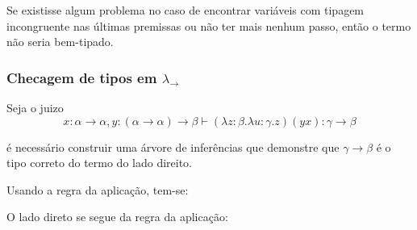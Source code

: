 \documentclass[../main.tex]{subfiles}
\begin{document}
Se existisse algum problema no caso de encontrar variáveis com tipagem incongruente nas últimas premissas ou não ter mais nenhum passo, então o termo não seria bem-tipado.



\subsubsection[Checagem de tipos no STLC]{Checagem de tipos em $\lambda_\to$}

Seja o juizo $$x : \alpha \to \alpha, y : (\alpha \to \alpha) \to \beta \vdash (\lambda z : \beta . \lambda u : \gamma . z)(yx) : \gamma \to \beta$$

é necessário construir uma árvore de inferências que demonstre que $\gamma \to \beta$ é o tipo correto do termo do lado direito.

\begin{prooftree}
\end{prooftree}

Usando a regra da aplicação, tem-se:

\begin{prooftree}
\end{prooftree}

O lado direto se segue da regra da aplicação:

\begin{prooftree}
\end{prooftree}
\end{document}
